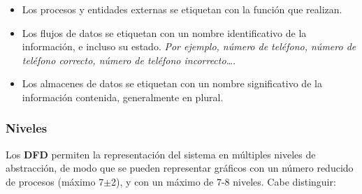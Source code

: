 \begin{itemize}
    \item Los procesos y entidades externas se etiquetan con la función que realizan.
    \item Los flujos de datos se etiquetan con un nombre identificativo de la información, e incluso su estado. \textit{Por ejemplo, número de teléfono, número de teléfono correcto, número de teléfono incorrecto\ldots}.
    \item Los almacenes de datos se etiquetan con un nombre significativo de la información contenida, generalmente en plural.
\end{itemize}

\subsubsection{Niveles}

Los \textbf{DFD} permiten la representación del sistema en múltiples niveles de abstracción, de modo que se pueden representar gráficos con un número reducido de procesos (máximo 7$\pm$2), y con un máximo de 7-8 niveles. Cabe distinguir:

